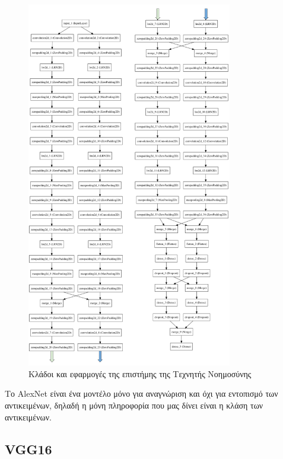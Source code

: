 \begin{figure}[!ht]
  \centering
  \includegraphics[width=0.8\textwidth]{./images/chapter5/alexnet_3.png}
  \caption[Κλάδοι και εφαρμογές της επιστήμης της Τεχνητής Νοημοσύνης]{Κλάδοι και εφαρμογές της επιστήμης της Τεχνητής Νοημοσύνης}
  \label{fig:alexnet_2}
\end{figure}

Το AlexNet είναι ένα μοντέλο μόνο για αναγνώριση και όχι για εντοπισμό
των αντικειμένων, δηλαδή η μόνη πληροφορία που μας δίνει είναι η κλάση των
αντικειμένων.

\subsection{VGG16}

